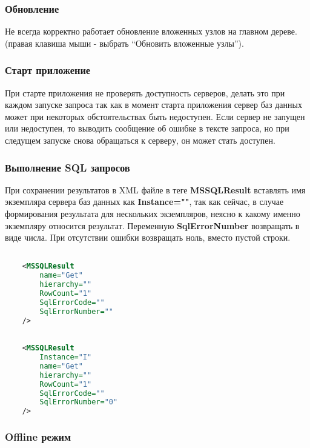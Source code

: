 \subsubsection{Обновление}

Не всегда корректно работает обновление вложенных узлов на главном дереве. (правая клавиша мыши -
выбрать ``Обновить вложенные узлы'').

\subsubsection{Старт приложение}

При старте приложения не проверять доступность серверов, делать это при каждом запуске запроса так
как в момент старта приложения сервер баз данных может при некоторых обстоятельствах быть
недоступен. Если сервер не запущен или недоступен, то выводить сообщение об ошибке в тексте запроса,
но при следущем запуске снова обращаться к серверу, он может стать доступен.

\subsubsection{Выполнение SQL запросов}

При сохранении результатов в XML файле в теге \textbf{MSSQLResult} вставлять имя экземпляра сервера
баз данных как \textbf{Instance=""}, так как сейчас, в случае формирования результата для нескольких
экземпляров, неясно к какому именно экземпляру относится результат. Переменную
\textbf{SqlErrorNumber} возвращать в виде числа. При отсутствии ошибки возвращать ноль, вместо
пустой строки.

\begin{lstlisting}[language=XML,label=current_result_set,caption=Выводится сейчас]

	<MSSQLResult
		name="Get"
		hierarchy=""
		RowCount="1"
		SqlErrorCode=""
		SqlErrorNumber=""
	/>

\end{lstlisting}

\begin{lstlisting}[language=XML,label=new_result_set,caption=Нужно выводить]

	<MSSQLResult
		Instance="I"
		name="Get"
		hierarchy=""
		RowCount="1"
		SqlErrorCode=""
		SqlErrorNumber="0"
	/>

\end{lstlisting}

\subsubsection{Offline режим}

